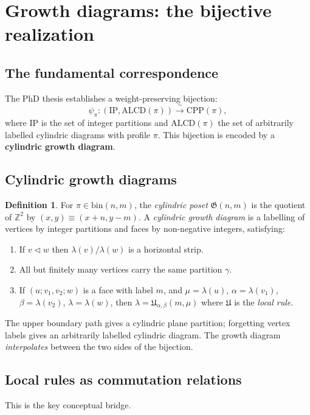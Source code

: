 \documentclass[11pt]{article}
\newcommand{\Z}{\mathbb{Z}}
\newcommand{\bin}{\mathrm{bin}}
\newcommand{\CPP}{\mathrm{CPP}}
\newcommand{\IP}{\mathrm{IP}}
\newcommand{\ALCD}{\mathrm{ALCD}}
\theoremstyle{plain}
\theoremstyle{definition}
\newtheorem{definition}[theorem]{Definition}
\begin{document}
\section{Growth diagrams: the bijective realization}

\subsection{The fundamental correspondence}
The PhD thesis establishes a weight-preserving bijection:
\begin{equation}\label{eq:bijection}
\psi_\pi : (\IP, \ALCD(\pi)) \xrightarrow{\;\sim\;} \CPP(\pi),
\end{equation}
where $\IP$ is the set of integer partitions and $\ALCD(\pi)$ the set of arbitrarily labelled cylindric diagrams with profile $\pi$.
This bijection is encoded by a \textbf{cylindric growth diagram}.

\subsection{Cylindric growth diagrams}
\begin{definition}
For $\pi \in \bin(n,m)$, the \emph{cylindric poset} $\mathfrak{G}(n,m)$ is the quotient of $\Z^2$ by $(x,y) \equiv (x+n, y-m)$.
A \emph{cylindric growth diagram} is a labelling of vertices by integer partitions and faces by non-negative integers, satisfying:
\begin{enumerate}
\item If $v \lhd w$ then $\lambda(v)/\lambda(w)$ is a horizontal strip.
\item All but finitely many vertices carry the same partition $\gamma$.
\item If $(u; v_1, v_2; w)$ is a face with label $m$, and $\mu = \lambda(u)$, $\alpha = \lambda(v_1)$, $\beta = \lambda(v_2)$, $\lambda = \lambda(w)$, then $\lambda = \mathfrak{U}_{\alpha,\beta}(m,\mu)$ where $\mathfrak{U}$ is the \emph{local rule}.
\end{enumerate}
\end{definition}

The upper boundary path gives a cylindric plane partition; forgetting vertex labels gives an arbitrarily labelled cylindric diagram.  The growth diagram \emph{interpolates} between the two sides of the bijection.

\subsection{Local rules as commutation relations}\label{sec:local-comm}
This is the key conceptual bridge.
\end{document}
